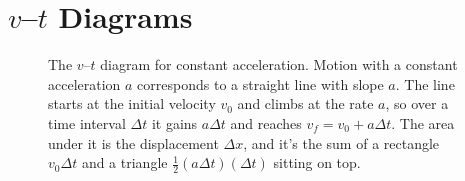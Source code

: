 \documentclass[../book.tex]{subfiles}
\begin{document}
\ifSubfilesClassLoaded{\appendix}{}

\chapter{$v$--$t$ Diagrams}
\label{ch:vt-diagram}

\begin{figure}[htbp]
    \centering
    \caption{The $v$--$t$ diagram for constant acceleration. Motion with a constant acceleration $a$ corresponds to a straight line with slope $a$. The line starts at the initial velocity $v_0$ and climbs at the rate $a$, so over a time interval $\Delta t$ it gains $a\Delta t$ and reaches $v_f = v_0 + a \Delta t$. The area under it is the displacement $\Delta x$, and it's the sum of a rectangle $v_0 \Delta t$ and a triangle $\frac{1}{2}(a \Delta t)(\Delta t)$ sitting on top.}
    \label{fig:vt-diagram-main}
  \end{figure}




\chapterbib
\end{document}
